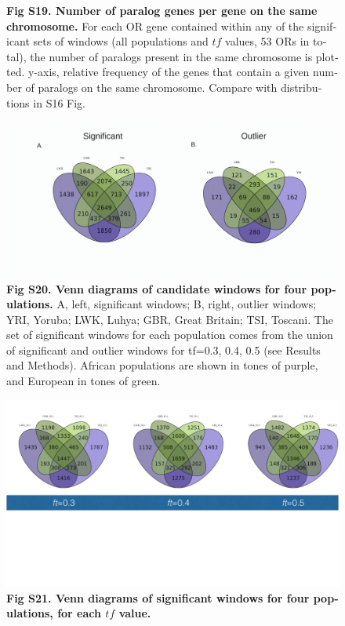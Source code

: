 \begin{refsection}
\begin{otherlanguage}{english}
\begin{figure}[!htb]
\caption*{\textbf{Fig S19. Number of paralog genes per gene on the same chromosome.}
For each OR gene contained within any of the significant sets of windows (all populations and $tf$ values, 53 ORs in total), the number of paralogs present in the same chromosome is plotted. y-axis, relative frequency of the genes that contain a given number of paralogs on the same chromosome. Compare with distributions in S16 Fig.
}
\end{figure}
%
\begin{figure}[!htb]
\includegraphics[]{chap2_folder/supp_figures/S20_Figure.png}
\caption*{\textbf{Fig S20. Venn diagrams of candidate windows for four populations.}
A, left, significant windows; B, right, outlier windows; YRI, Yoruba; LWK, Luhya; GBR, Great Britain; TSI, Toscani. The set of significant windows for each population comes from the union of significant and outlier windows for tf={0.3, 0.4, 0.5} (see Results and Methods). African populations are shown in tones of purple, and European in tones of green.}
\end{figure}
\begin{figure}
\includegraphics[]{chap2_folder/supp_figures/S21_Fig.png}
\caption*{\textbf{Fig S21. Venn diagrams of significant windows for four populations, for each $tf$ value. }
}
\end{figure}
\end{otherlanguage}
\end{refsection}
